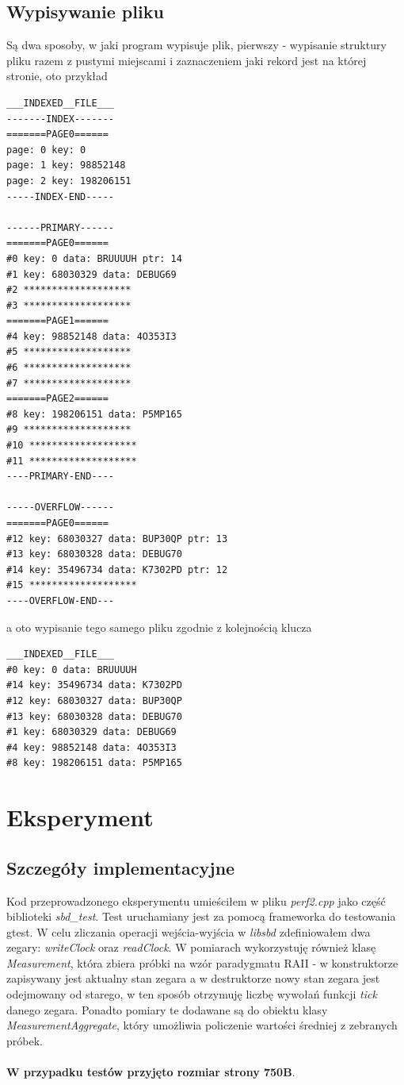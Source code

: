 \documentclass{article}
\begin{document}
\subsection{Wypisywanie pliku}
Są dwa sposoby, w jaki program wypisuje plik, pierwszy - wypisanie struktury pliku razem z pustymi miejscami i zaznaczeniem jaki rekord jest na której stronie, oto przykład
\begin{lstlisting}
___INDEXED__FILE___
-------INDEX-------
=======PAGE0======
page: 0 key: 0
page: 1 key: 98852148
page: 2 key: 198206151
-----INDEX-END-----

------PRIMARY------
=======PAGE0======
#0 key: 0 data: BRUUUUH ptr: 14
#1 key: 68030329 data: DEBUG69
#2 *******************
#3 *******************
=======PAGE1======
#4 key: 98852148 data: 4O353I3
#5 *******************
#6 *******************
#7 *******************
=======PAGE2======
#8 key: 198206151 data: P5MP165
#9 *******************
#10 *******************
#11 *******************
----PRIMARY-END----

-----OVERFLOW------
=======PAGE0======
#12 key: 68030327 data: BUP30QP ptr: 13
#13 key: 68030328 data: DEBUG70
#14 key: 35496734 data: K7302PD ptr: 12
#15 *******************
----OVERFLOW-END---
\end{lstlisting}
a oto wypisanie tego samego pliku zgodnie z kolejnością klucza
\begin{lstlisting}
___INDEXED__FILE___
#0 key: 0 data: BRUUUUH
#14 key: 35496734 data: K7302PD
#12 key: 68030327 data: BUP30QP
#13 key: 68030328 data: DEBUG70
#1 key: 68030329 data: DEBUG69
#4 key: 98852148 data: 4O353I3
#8 key: 198206151 data: P5MP165
\end{lstlisting}

\section{Eksperyment}
\subsection{Szczegóły implementacyjne}
Kod przeprowadzonego eksperymentu umieściłem w pliku \textit{perf2.cpp} jako część biblioteki \textit{sbd\_test}. Test uruchamiany jest za pomocą frameworka do
testowania gtest. W celu zliczania operacji wejścia-wyjścia w \textit{libsbd} zdefiniowałem dwa zegary: 
\textit{writeClock} oraz \textit{readClock}. W pomiarach wykorzystuję również klasę \textit{Measurement}, która zbiera próbki na wzór paradygmatu RAII - w 
konstruktorze zapisywany jest aktualny stan zegara a w destruktorze nowy stan zegara jest odejmowany od starego, w ten sposób otrzymuję liczbę
wywołań funkcji \textit{tick} danego zegara. Ponadto pomiary te dodawane są do obiektu klasy \textit{MeasurementAggregate}, który umożliwia policzenie wartości średniej z zebranych próbek. \\\\
\textbf{W przypadku testów przyjęto rozmiar strony 750B}.
\end{document}

